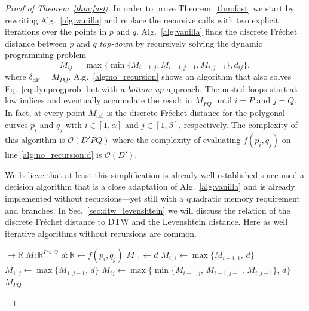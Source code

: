 \begin{proof}[Proof of Theorem~\ref{thm:fast}]
In order to prove Theorem~\ref{thm:fast} we start by rewriting Alg.~\ref{alg:vanilla} and replace the recursive calls with two explicit iterations over the points in $p$ and $q$.
Alg.~\ref{alg:vanilla} finds the discrete Fr\'echet distance between $p$ and $q$ \textit{top-down} by recursively solving the dynamic programming problem
\begin{equation}
    \label{eq:dynprogprob}
    M_{ij} = \max\{ \min\{ M_{i-1,j}, M_{i-1,j-1}, M_{i,j-1} \}, d_{ij} \},
\end{equation}
where $\delta_\mathrm{dF} = M_{PQ}$.
Alg.~\ref{alg:no_recursion} shows an algorithm that also solves Eq.~\eqref{eq:dynprogprob} but with a \textit{bottom-up} approach.
The nested loops start at low indices and eventually accumulate the result in $M_{PQ}$ until $i=P$ and $j=Q$.
In fact, at every point $M_{\alpha \beta}$ is the discrete Fr\'echet distance for the polygonal curves $p_i$ and $q_j$ with $i \in [1, \alpha]$ and $j \in [1, \beta]$, respectively.
The complexity of this algorithm is $\mathcal{O}(D'PQ)$ where the complexity of evaluating $f(p_i, q_j)$ on line \ref{alg:no_recursion:d} is $\mathcal{O}(D')$.

We believe that at least this simplification is already well established since \citet{ahn10} used a decision algorithm that is a close adaptation of Alg.~\ref{alg:vanilla} and is already implemented without recursions---yet still with a quadratic memory requirement and branches.
In Sec.~\ref{sec:dtw_levenshtein} we will discuss the relation of the discrete Fr\'echet distance to DTW and the Levenshtein distance.
Here as well iterative algorithms without recursions are common.

\begin{algorithm}
    \caption{Variant of Alg.~\ref{alg:vanilla} without recursions.}
    \label{alg:no_recursion}
    \begin{algorithmic}[1]
         $\to \mathbb{R}$
            \State $M: \mathbb{R}^{P \times Q}$
            \Statex
                    \State $d: \mathbb{R} \gets f(p_i, q_j)$ \label{alg:no_recursion:d}
                    \Statex
                        \State $M_{11} \gets d$
                        \State $M_{i,1} \gets \max\{M_{i-1,1},\, d \}$
                        \State $M_{1,j} \gets \max\{M_{1,j-1},\, d \}$
                    \Else
                        \State $M_{ij} \gets \max\{\min\{M_{i-1,j},\, M_{i-1,j-1},\, M_{i,j-1}\},\, d \}$
                    \EndIf
                \EndFor
            \EndFor
            \Statex
            \State \Return $M_{PQ}$   
        \EndFunction
    \end{algorithmic}
\end{algorithm}


\end{proof}
